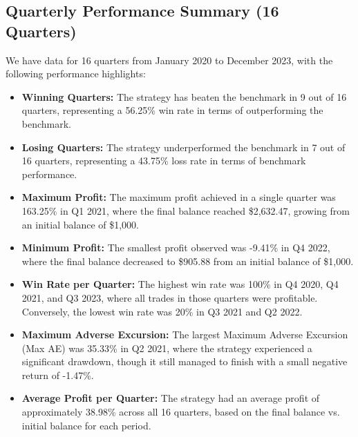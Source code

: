 \documentclass[12pt]{article}
\begin{document}
\subsection{Quarterly Performance Summary (16 Quarters)}
We have data for 16 quarters from January 2020 to December 2023, with the following performance highlights:
\begin{itemize}
    \item \textbf{Winning Quarters:} The strategy has beaten the benchmark in 9 out of 16 quarters, representing a 56.25\% win rate in terms of outperforming the benchmark.
    \item \textbf{Losing Quarters:} The strategy underperformed the benchmark in 7 out of 16 quarters, representing a 43.75\% loss rate in terms of benchmark performance.
    \item \textbf{Maximum Profit:} The maximum profit achieved in a single quarter was 163.25\% in Q1 2021, where the final balance reached \$2,632.47, growing from an initial balance of \$1,000.
    \item \textbf{Minimum Profit:} The smallest profit observed was -9.41\% in Q4 2022, where the final balance decreased to \$905.88 from an initial balance of \$1,000.
    \item \textbf{Win Rate per Quarter:} The highest win rate was 100\% in Q4 2020, Q4 2021, and Q3 2023, where all trades in those quarters were profitable. Conversely, the lowest win rate was 20\% in Q3 2021 and Q2 2022.
    \item \textbf{Maximum Adverse Excursion:} The largest Maximum Adverse Excursion (Max AE) was 35.33\% in Q2 2021, where the strategy experienced a significant drawdown, though it still managed to finish with a small negative return of -1.47\%.
    \item \textbf{Average Profit per Quarter:} The strategy had an average profit of approximately 38.98\% across all 16 quarters, based on the final balance vs. initial balance for each period.
\end{itemize}
\end{document}
